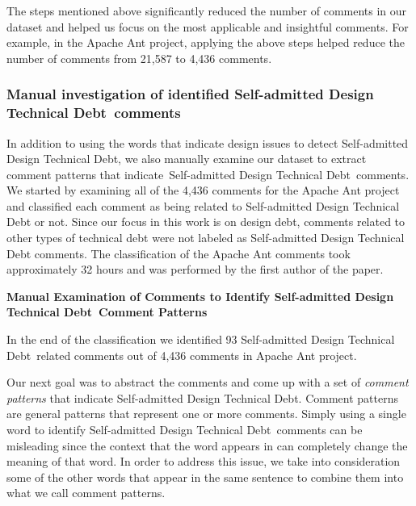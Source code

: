 \documentclass[conference]{IEEEtran}
\newcommand{\SADTD}{Self-admitted Design Technical Debt\xspace}
\begin{document}
The steps mentioned above significantly reduced the number of comments in our dataset and helped us focus on the most applicable and insightful comments. For example, in the Apache Ant project, applying the above steps helped reduce the number of comments from 21,587 to 4,436 comments.


\subsubsection{Manual investigation of identified \SADTD~comments} 

In addition to using the words that indicate design issues to detect \SADTD, we also manually examine our dataset to extract comment patterns that indicate~\SADTD~comments. We started by examining all of the 4,436 comments for the Apache Ant project and classified each comment as being related to \SADTD or not. Since our focus in this work is on design debt, comments related to other types of technical debt were not labeled as \SADTD comments. The classification of the Apache Ant comments took approximately 32 hours and was performed by the first author of the paper.

\noindent \textbf{Manual Examination of Comments to Identify \SADTD~Comment Patterns}

In the end of the classification we identified 93 \SADTD~related comments out of 4,436 comments in Apache Ant project.

Our next goal was to abstract the comments and come up with a set of \emph{comment patterns} that indicate \SADTD. Comment patterns are general patterns that represent one or more comments. Simply using a single word to identify \SADTD~comments can be misleading since the context that the word appears in can completely change the meaning of that word. In order to address this issue, we take into consideration some of the other words that appear in the same sentence to combine them into what we call comment patterns. 


\end{document}
